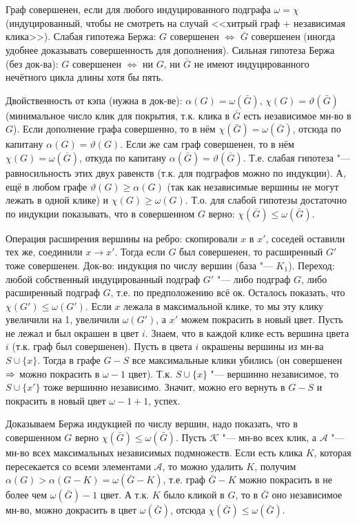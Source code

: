 \section{} %
	Граф совершенен, если для любого индуцированного подграфа $\omega=\chi$ (индуцированный, чтобы не смотреть на случай <<хитрый граф + независимая клика>>).
	Слабая гипотежа Бержа: $G$ совершенен $\iff$ $\bar G$ совершенен (иногда удобнее доказывать совершенность для дополнения).
	Сильная гипотеза Бержа (без док-ва): $G$ совершенен $\iff$ ни $G$, ни $\bar G$ не имеют индуцированного нечётного цикла длины хотя бы пять.

	Двойственность от кэпа (нужна в док-ве): $\alpha(G)=\omega(\bar G)$, $\chi(G)=\vartheta(\bar G)$ (минимальное число клик для покрытия, т.к. клика в $\bar G$ есть независимое мн-во в $G$).
	Если дополнение графа совершенно, то в нём $\chi(\bar G)=\omega(\bar G)$, отсюда по капитану $\alpha(G)=\vartheta(G)$.
	Если же сам граф совершенен, то в нём $\chi(G)=\omega(\bar G)$, откуда по капитану $\alpha(\bar G)=\vartheta(\bar G)$.
	Т.е. слабая гипотеза "--- равносильность этих двух равенств (т.к. для подграфов можно по индукции).
	А, ещё в любом графе $\vartheta(G)\ge \alpha(G)$ (так как независимые вершины не могут лежать в одной клике) и $\chi(G)\ge \omega(G)$.
	Т.о. для слабой гипотезы достаточно по индукции показывать, что в совершенном $G$ верно: $\chi(\bar G) \le \omega(\bar G)$.

	Операция расширения вершины на ребро: скопировали $x$ в $x'$, соседей оставили тех же, соединили $x \to x'$.
	Тогда если $G$ был совершенен, то расширенный $G'$ тоже совершенен.
	Док-во: индукция по числу вершин (база "--- $K_1$).
	Переход: любой собственный индуцированный подграф $G'$ "--- либо подграф $G$, либо расширенный подграф $G$, т.е. по предположению всё ок.
	Осталось показать, что $\chi(G') \le \omega(G')$.
	Если $x$ лежала в максимальной клике, то мы эту клику увеличили на 1, увеличили $\omega(G')$, а $x'$ можем покрасить в новый цвет.
	Пусть не лежал и был окрашен в цвет $i$.
	Знаем, что в каждой клике есть вершина цвета $i$ (т.к. граф был совершенен).
	Пусть в цвета $i$ окрашены вершины из мн-ва $S\cup \{x\}$.
	Тогда в графе $G-S$ все максимальные клики убились (он совершенен $\Rightarrow$ можно покрасить в $\omega-1$ цвет).
	Т.к. $S \cup \{x\}$ "--- вершинно независимое, то $S \cup \{x'\}$ тоже вершинно независимо.
	Значит, можно его вернуть в $G-S$ и покрасить в новый цвет $\omega-1+1$, успех.

	Доказываем Бержа индукцией по числу вершин, надо показать, что в совершенном $G$ верно $\chi(\bar G) \le \omega(\bar G)$.
	Пусть $\mathcal{K}$ "--- мн-во всех клик, а $\mathcal{A}$ "--- мн-во всех максимальных независимых подмножеств.
	Если есть клика $K$, которая пересекается со всеми элементами $\mathcal{A}$, то можно удалить $K$,
	получим $\alpha(G)>\alpha(G-K)=\omega(\bar G - K)$, т.е. граф $\bar G - K$ можно покрасить в не более чем $\omega(\bar G)-1$ цвет.
	А т.к. $K$ было кликой в $G$, то в $\bar G$ оно независимое мн-во, можно докрасить в цвет $\omega(\bar G)$, отсюда $\chi(\bar G)\le\omega(\bar G)$.

